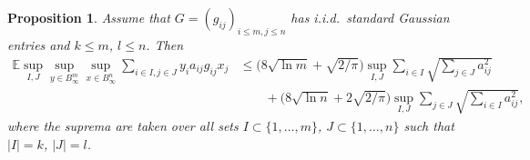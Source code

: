 \documentclass[a4paper]{amsart}
\newtheorem{proposition}[theorem]{Proposition} %
\theoremstyle{definition}
\theoremstyle{remark}
\numberwithin{equation}{section}
\newcommand*{\EE}{\mathbb{E}}
\begin{document}
\begin{proposition}
\label{prop:auxilary-main-gauss}
 	Assume that $G=(g_{ij})_{i\leq m, j\leq n}$ has i.i.d.\ standard Gaussian entries and $k \leq m$, $l\leq n$.
 	Then
	\begin{align*}	
\EE \sup_{I, J} \sup_{y\in B_\infty^m}\sup_{x\in B_\infty^n}
\sum_{i\in I, j\in J} y_i a_{ij} g_{ij} x_j
&\leq
\bigl(8\sqrt{\ln m} + \sqrt{2/\pi}\bigr)	\sup_{I, J}  \sum_{i\in I}  \sqrt{\sum_{j\in J} a_{ij}^2} \nonumber\\
& \qquad + \bigl(8\sqrt{\ln n} +2 \sqrt{2/\pi}\bigr)  \sup_{I, J} \sum_{j\in J} \sqrt{\sum_{i\in I} a_{ij}^2 },
	\end{align*}
where the suprema are taken over all sets
$I\subset \{1,\ldots,m\}$, $J\subset \{1,\ldots,n\}$ such that $|I| = k$, $|J| = l$.
\end{proposition}
\end{document}
